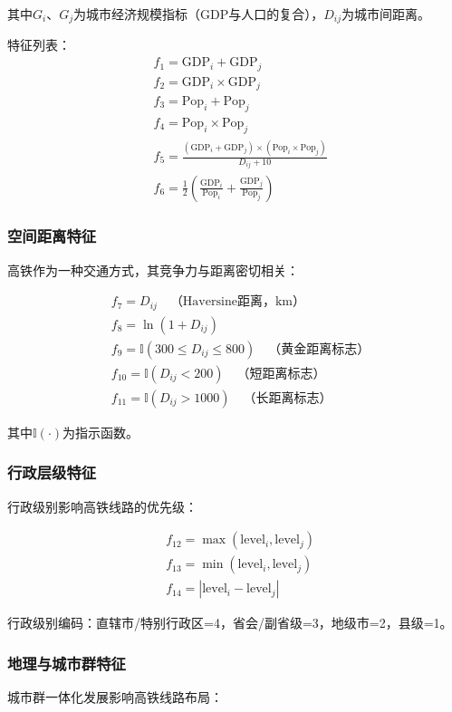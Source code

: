 \documentclass[12pt,a4paper]{article}
\begin{document}
其中$G_i$、$G_j$为城市经济规模指标（GDP与人口的复合），$D_{ij}$为城市间距离。

特征列表：
\begin{align}
& f_1 = \text{GDP}_i + \text{GDP}_j \\
& f_2 = \text{GDP}_i \times \text{GDP}_j \\
& f_3 = \text{Pop}_i + \text{Pop}_j \\
& f_4 = \text{Pop}_i \times \text{Pop}_j \\
& f_5 = \frac{(\text{GDP}_i + \text{GDP}_j) \times (\text{Pop}_i \times \text{Pop}_j)}{D_{ij} + 10} \\
& f_6 = \frac{1}{2}\left(\frac{\text{GDP}_i}{\text{Pop}_i} + \frac{\text{GDP}_j}{\text{Pop}_j}\right)
\end{align}

\subsubsection{空间距离特征}
高铁作为一种交通方式，其竞争力与距离密切相关：

\begin{align}
& f_7 = D_{ij} \quad \text{（Haversine距离，km）} \\
& f_8 = \ln(1 + D_{ij}) \\
& f_9 = \mathbb{I}(300 \leq D_{ij} \leq 800) \quad \text{（黄金距离标志）} \\
& f_{10} = \mathbb{I}(D_{ij} < 200) \quad \text{（短距离标志）} \\
& f_{11} = \mathbb{I}(D_{ij} > 1000) \quad \text{（长距离标志）}
\end{align}

其中$\mathbb{I}(\cdot)$为指示函数。

\subsubsection{行政层级特征}
行政级别影响高铁线路的优先级：

\begin{align}
& f_{12} = \max(\text{level}_i, \text{level}_j) \\
& f_{13} = \min(\text{level}_i, \text{level}_j) \\
& f_{14} = |\text{level}_i - \text{level}_j|
\end{align}

行政级别编码：直辖市/特别行政区=4，省会/副省级=3，地级市=2，县级=1。

\subsubsection{地理与城市群特征}
城市群一体化发展影响高铁线路布局：
\end{document}
